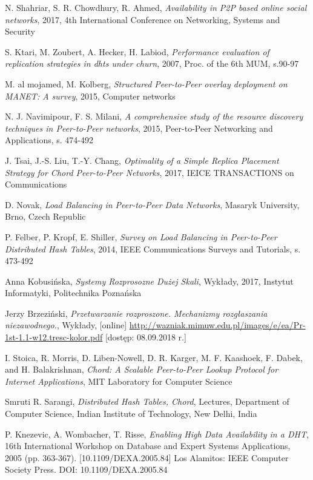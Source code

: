 \documentclass[12pt, twoside, openany]{report}
\begin{document}
\begin{thebibliography}{11}
 N. Shahriar, S. R. Chowdhury, R. Ahmed, \emph{Availability in P2P based online social networks}, 2017, 4th International Conference on Networking, Systems and Security

 S. Ktari, M. Zoubert, A. Hecker, H. Labiod, \emph{Performance evaluation of replication strategies in dhts under churn}, 2007, Proc. of the 6th MUM, s.90-97

 M. al mojamed, M. Kolberg, \emph{Structured Peer-to-Peer overlay deployment on MANET: A survey}, 2015, Computer networks

 N. J. Navimipour, F. S. Milani, \emph{A comprehensive study of the resource discovery techniques in Peer-to-Peer networks}, 2015, Peer-to-Peer Networking and Applications, s. 474-492

 J. Tsai, J.-S. Liu, T.-Y. Chang, \emph{Optimality of a Simple Replica Placement Strategy for Chord Peer-to-Peer Networks}, 2017, IEICE TRANSACTIONS on Communications

 D. Novak, \emph{Load Balancing in Peer-to-Peer Data Networks}, Masaryk University, Brno, Czech Republic 

 P. Felber, P. Kropf, E. Shiller, \emph{Survey on Load Balancing in Peer-to-Peer Distributed Hash Tables}, 2014, IEEE Communications Surveys and Tutorials, s. 473-492

 Anna Kobusińska, \emph{Systemy Rozprosozne Dużej Skali}, Wykłady, 2017, Instytut Informatyki, Politechnika Poznańska

 Jerzy Brzeziński, \emph{Przetwarzanie rozproszone. Mechanizmy rozgłaszania niezawodnego.}, Wykłady, [online] \url{http://wazniak.mimuw.edu.pl/images/e/ea/Pr-1st-1.1-w12.tresc-kolor.pdf} [dostęp: 08.09.2018 r.]

  I. Stoica, R. Morris, D. Liben-Nowell, D. R. Karger, M. F. Kaashoek, F. Dabek, and H. Balakrishnan, \emph{Chord: A Scalable Peer-to-Peer Lookup Protocol for Internet Applications}, MIT Laboratory for Computer Science

 Smruti R. Sarangi, \emph{Distributed Hash Tables, Chord}, Lectures, Department of Computer Science, Indian Institute of Technology, New Delhi, India

 P. Knezevic, A. Wombacher, T. Risse, \emph{Enabling High Data Availability in a DHT}, 16th International Workshop on Database and Expert Systems Applications, 2005 (pp. 363-367). [10.1109/DEXA.2005.84] Los Alamitos: IEEE Computer Society Press. DOI: 10.1109/DEXA.2005.84


\end{thebibliography}
\end{document}
